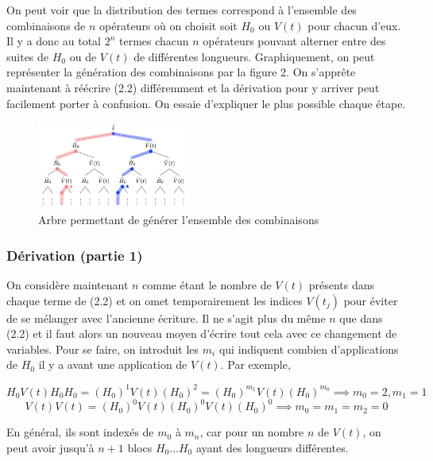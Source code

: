 On peut voir que la distribution des termes correspond à l'ensemble des combinaisons de $n$ opérateurs où on choisit soit $H_0$ ou $V(t)$ pour chacun d'eux. Il y a donc au total $2^n$ termes chacun $n$ opérateurs pouvant alterner entre des suites de $H_0$ ou de $V(t)$ de différentes longueurs. Graphiquement, on peut représenter la génération des combinaisons par la figure 2. On s'apprête maintenant à réécrire (2.2) différemment et la dérivation pour y arriver peut facilement porter à confusion. On essaie d'expliquer le plus possible chaque étape.

\begin{figure}[H]
    \centering
     \includegraphics[width=0.45\textwidth]{images/ch2/embranchements.png}
    \caption{Arbre permettant de générer l'ensemble des combinaisons}
\end{figure}

\subsubsection{Dérivation (partie 1)}
On considère maintenant $n$ comme étant le nombre de $V(t)$ présents dans chaque terme de (2.2) et on omet temporairement les indices $V(t_j)$ pour éviter de se mélanger avec l'ancienne écriture. Il ne s'agit plus du même $n$ que dans (2.2) et il faut alors un nouveau moyen d'écrire tout cela avec ce changement de variables. Pour se faire, on introduit les $m_i$ qui indiquent combien d'applications de $H_0$ il y a avant une application de $V(t)$. Par exemple,

\begin{equation*}
    H_0V(t)H_0H_0 = (H_0)^1V(t)(H_0)^2 = (H_0)^{m_1}V(t)(H_0)^{m_0} \implies m_0 = 2, m_1 = 1
\end{equation*}
\begin{equation*}
    V(t)V(t) = (H_0)^0V(t)(H_0)^0V(t)(H_0)^0 \implies m_0 = m_1 = m_2 = 0
\end{equation*}

En général, ils sont indexés de $m_0$ à $m_n$, car pour un nombre $n$ de $V(t)$, on peut avoir jusqu'à $n+1$ blocs $H_0...H_0$ ayant des longueurs différentes.

